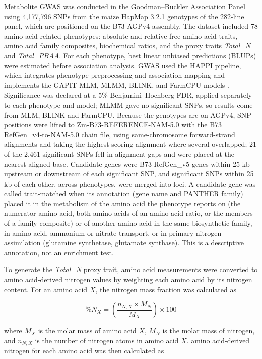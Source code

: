 Metabolite GWAS was conducted in the Goodman--Buckler Association Panel \citep{FlintGarcia2005Goodman} using 4,177,796 SNPs from the maize HapMap 3.2.1 genotypes of the 282-line panel, which are positioned on the B73 AGPv4 assembly. The dataset included 78 amino acid-related phenotypes: absolute and relative free amino acid traits, amino acid family composites, biochemical ratios, and the proxy traits \textit{Total\_N} and \textit{Total\_PBAA}. For each phenotype, best linear unbiased predictions (BLUPs) were estimated before association analysis. GWAS used the HAPPI pipeline, which integrates phenotype preprocessing and association mapping and implements the GAPIT MLM, MLMM, BLINK, and FarmCPU models \citep{Slaten2020HAPPI}. Significance was declared at a 5\% Benjamini--Hochberg FDR, applied separately to each phenotype and model; MLMM gave no significant SNPs, so results come from MLM, BLINK and FarmCPU. Because the genotypes are on AGPv4, SNP positions were lifted to Zm-B73-REFERENCE-NAM-5.0 with the B73 RefGen\_v4-to-NAM-5.0 chain file, using same-chromosome forward-strand alignments and taking the highest-scoring alignment where several overlapped; 21 of the 2,461 significant SNPs fell in alignment gaps and were placed at the nearest aligned base. Candidate genes were B73 RefGen\_v5 genes within 25 kb upstream or downstream of each significant SNP, and significant SNPs within 25 kb of each other, across phenotypes, were merged into loci. A candidate gene was called trait-matched when its annotation (gene name and PANTHER family) placed it in the metabolism of the amino acid the phenotype reports on (the numerator amino acid, both amino acids of an amino acid ratio, or the members of a family composite) or of another amino acid in the same biosynthetic family, in amino acid, ammonium or nitrate transport, or in primary nitrogen assimilation (glutamine synthetase, glutamate synthase). This is a descriptive annotation, not an enrichment test.

To generate the \textit{Total\_N} proxy trait, amino acid measurements were converted to amino acid-derived nitrogen values by weighting each amino acid by its nitrogen content. For an amino acid $X$, the nitrogen mass fraction was calculated as

\[
\%N_X =
\left(
\frac{n_{N,X}\times M_N}{M_X}
\right)\times 100
\]

where $M_X$ is the molar mass of amino acid $X$, $M_N$ is the molar mass of nitrogen, and $n_{N,X}$ is the number of nitrogen atoms in amino acid $X$. amino acid-derived nitrogen for each amino acid was then calculated as

